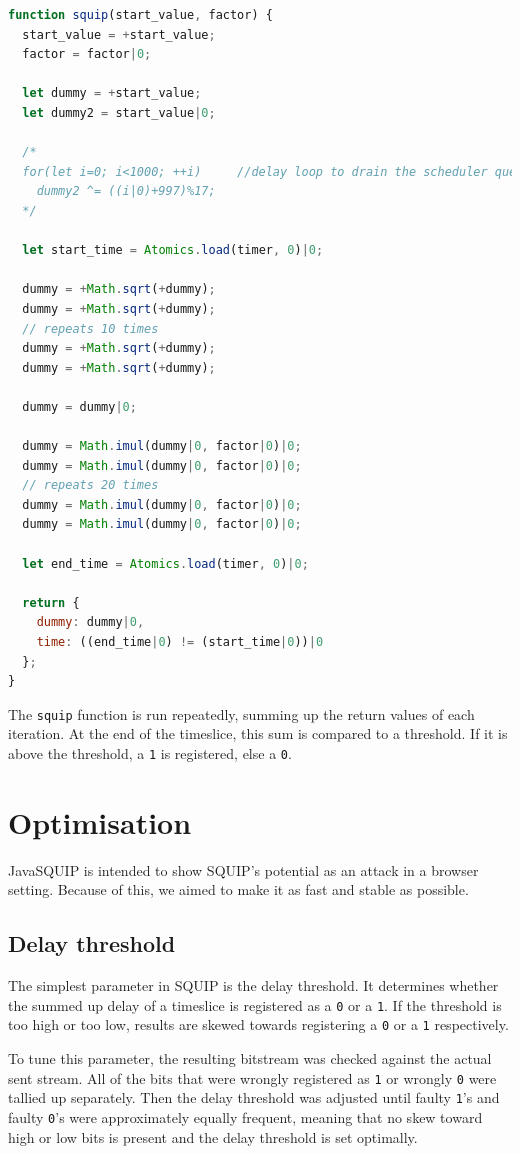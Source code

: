 \documentclass[11pt,
  titlepage=false,
]{scrreprt}
\begin{document}
\begin{lstlisting}[language=JavaScript]
    function squip(start_value, factor) {
  start_value = +start_value;
  factor = factor|0;

  let dummy = +start_value;
  let dummy2 = start_value|0;

  /*
  for(let i=0; i<1000; ++i)     //delay loop to drain the scheduler queue
    dummy2 ^= ((i|0)+997)%17;
  */

  let start_time = Atomics.load(timer, 0)|0;

  dummy = +Math.sqrt(+dummy);
  dummy = +Math.sqrt(+dummy);
  // repeats 10 times
  dummy = +Math.sqrt(+dummy);
  dummy = +Math.sqrt(+dummy);

  dummy = dummy|0;

  dummy = Math.imul(dummy|0, factor|0)|0;
  dummy = Math.imul(dummy|0, factor|0)|0;
  // repeats 20 times
  dummy = Math.imul(dummy|0, factor|0)|0;
  dummy = Math.imul(dummy|0, factor|0)|0;

  let end_time = Atomics.load(timer, 0)|0;

  return {
    dummy: dummy|0,
    time: ((end_time|0) != (start_time|0))|0
  };
}
\end{lstlisting}

The \texttt{squip} function is run repeatedly, summing up the return values of each iteration.
At the end of the timeslice, this sum is compared to a threshold.
If it is above the threshold, a \texttt{1} is registered, else a \texttt{0}.

\section{Optimisation}
JavaSQUIP is intended to show SQUIP's potential as an attack in a browser setting.
Because of this, we aimed to make it as fast and stable as possible.

\subsection{Delay threshold}
The simplest parameter in SQUIP is the delay threshold.
It determines whether the summed up delay of a timeslice is registered as a \texttt{0} or a \texttt{1}.
If the threshold is too high or too low, results are skewed towards registering a \texttt{0} or a \texttt{1} respectively.

To tune this parameter, the resulting bitstream was checked against the actual sent stream.
All of the bits that were wrongly registered as \texttt{1} or wrongly \texttt{0} were tallied up separately.
Then the delay threshold was adjusted until faulty \texttt{1}'s and faulty \texttt{0}'s were approximately equally frequent,
meaning that no skew toward high or low bits is present and the delay threshold is set optimally.
\end{document}

